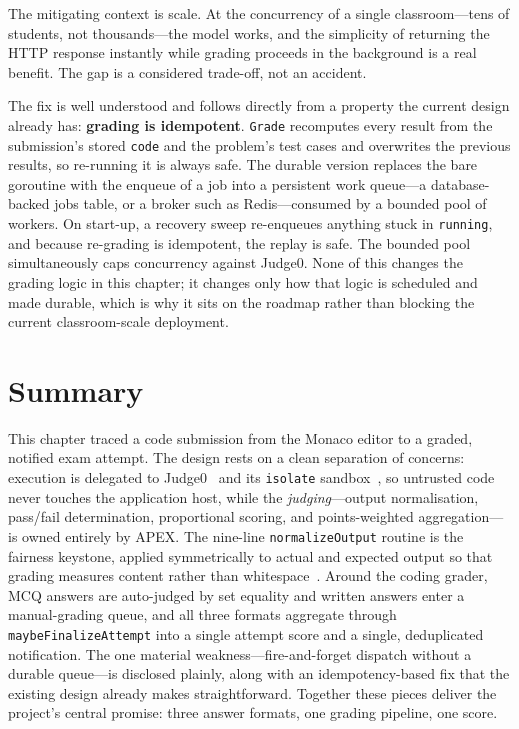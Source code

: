 The mitigating context is scale. At the concurrency of a single classroom---tens of students, not
thousands---the model works, and the simplicity of returning the HTTP response instantly while
grading proceeds in the background is a real benefit. The gap is a considered trade-off, not an
accident.

The fix is well understood and follows directly from a property the current design already has:
\textbf{grading is idempotent}. \texttt{Grade} recomputes every result from the submission's stored
\texttt{code} and the problem's test cases and overwrites the previous results, so re-running it is
always safe. The durable version replaces the bare goroutine with the enqueue of a job into a
persistent work queue---a database-backed jobs table, or a broker such as Redis---consumed by a
bounded pool of workers. On start-up, a recovery sweep re-enqueues anything stuck in
\texttt{running}, and because re-grading is idempotent, the replay is safe. The bounded pool
simultaneously caps concurrency against Judge0. None of this changes the grading logic in this
chapter; it changes only how that logic is scheduled and made durable, which is why it sits on the
roadmap rather than blocking the current classroom-scale deployment.

\section{Summary}\label{sec:grading-summary}

This chapter traced a code submission from the Monaco editor to a graded, notified exam attempt.
The design rests on a clean separation of concerns: execution is delegated to
Judge0~\cite{judge0,dosilovic2018judge0} and its \texttt{isolate} sandbox~\cite{isolate}, so
untrusted code never touches the application host, while the \emph{judging}---output
normalisation, pass/fail determination, proportional scoring, and points-weighted
aggregation---is owned entirely by APEX. The nine-line \texttt{normalizeOutput} routine is the
fairness keystone, applied symmetrically to actual and expected output so that grading measures
content rather than whitespace~\cite{douce2005autoassess}. Around the coding grader, MCQ answers
are auto-judged by set equality and written answers enter a manual-grading queue, and all three
formats aggregate through \texttt{maybeFinalizeAttempt} into a single attempt score and a single,
deduplicated notification. The one material weakness---fire-and-forget dispatch without a durable
queue---is disclosed plainly, along with an idempotency-based fix that the existing design already
makes straightforward. Together these pieces deliver the project's central promise: three answer
formats, one grading pipeline, one score.
